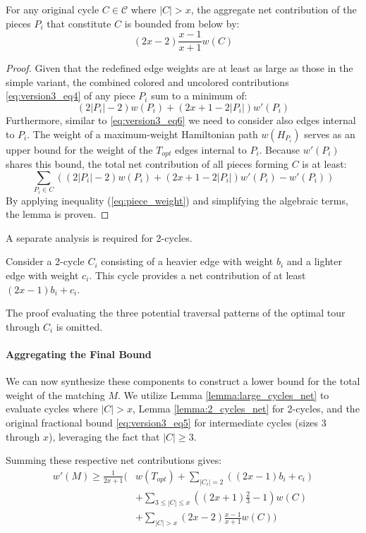 \begin{lemma} \label{lemma:large_cycles_net}
For any original cycle $C \in \mathcal{C}$ where $|C| > x$, the aggregate net
contribution of the pieces $P_i$ that constitute $C$ is bounded from below by:
$$ (2x - 2)\frac{x-1}{x+1}w(C) $$
\end{lemma}

\begin{proof}
Given that the redefined edge weights are at least as large as those in the
simple variant, the combined colored and uncolored contributions
\ref{eq:version3_eq4} of any piece $P_i$ sum to a minimum of:
$$ (2|P_i| - 2)w(P_i) + (2x + 1 - 2|P_i|)w'(P_i) $$
Furthermore, similar to \ref{eq:version3_eq6} we need to consider also edges
internal to $P_i$. The weight of a maximum-weight Hamiltonian path $w(H_{P_i})$
serves as an upper bound for the weight of the $T_{opt}$ edges internal to
$P_i$. Because $w'(P_i)$ shares this bound, the total net contribution of all
pieces forming $C$ is at least:
$$ \sum_{P_i \in C} \left( (2|P_i| - 2)w(P_i) + (2x + 1 - 2|P_i|)w'(P_i) -
w'(P_i) \right) $$
By applying inequality (\ref{eq:piece_weight}) and simplifying the algebraic
terms, the lemma is proven.
\end{proof}

A separate analysis is required for 2-cycles.

\begin{lemma} \label{lemma:2_cycles_net}
Consider a 2-cycle $C_i$ consisting of a heavier edge with weight $b_i$ and a
lighter edge with weight $c_i$. This cycle provides a net contribution of at
least $(2x - 1)b_i + c_i$.
\end{lemma}
The proof evaluating the three potential traversal patterns of the optimal tour
through $C_i$ is omitted.

\paragraph{Aggregating the Final Bound}
We can now synthesize these components to construct a lower bound for the total
weight of the matching $M$. We utilize Lemma \ref{lemma:large_cycles_net} to
evaluate cycles where $|C| > x$, Lemma \ref{lemma:2_cycles_net} for 2-cycles,
and the original fractional bound \ref{eq:version3_eq5} for intermediate cycles
(sizes 3 through $x$), leveraging the fact that $|C| \ge 3$.

Summing these respective net contributions gives:
\begin{align*}
w'(M) \ge \frac{1}{2x + 1} \Bigg( &w(T_{opt}) + \sum_{|C_i| = 2} \left( (2x - 1)b_i + c_i \right) \\
&+ \sum_{3 \le |C| \le x} \left( (2x + 1)\frac{2}{3} - 1 \right)w(C) \\
&+ \sum_{|C| > x} (2x - 2)\frac{x-1}{x+1}w(C) \Bigg)
\end{align*}

